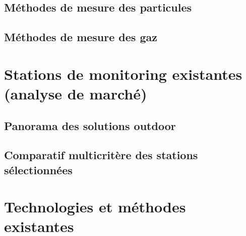 \subsection{Méthodes de mesure des particules}
\subsection{Méthodes de mesure des gaz}

\section{Stations de monitoring existantes (analyse de marché)}
\subsection{Panorama des solutions outdoor}
\subsection{Comparatif multicritère des stations sélectionnées}

\section{Technologies et méthodes existantes}




